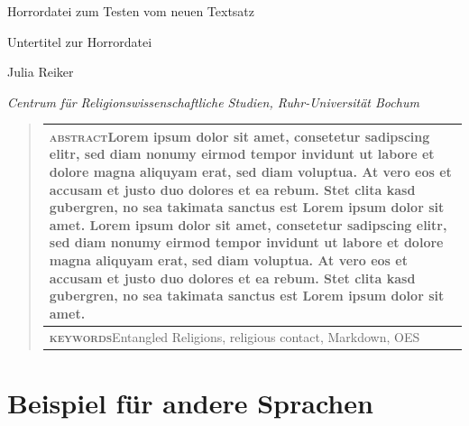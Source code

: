 \documentclass[
  english,
  a4paper,
  DIV=12,
  footlines=2.1,
  usegeometry=true]{scrartcl}
\begin{document}
\begin{singlespace}
\vspace*{2\baselineskip}
{\LARGE\noindent\raggedright Horrordatei zum Testen
vom neuen Textsatz\par}
\vspace*{.5\baselineskip}
{\Large\noindent\raggedright Untertitel zur
Horrordatei\par}
\vspace{2\baselineskip}
{\noindent Julia Reiker\par}
{\normalfont\itshape\normalsize\noindent Centrum für
Religionswissenschaftliche Studien, Ruhr-Universität Bochum\par}
\vspace{\baselineskip}
\vspace{2\baselineskip}
\end{singlespace}
\begin{quote}
\small
\begin{tabular}{@{}p{\linewidth}@{}}
\toprule
{\bfseries\scshape abstract}\hspace{1em}Lorem ipsum dolor sit amet,
consetetur sadipscing elitr, sed diam nonumy eirmod tempor invidunt ut
labore et dolore magna aliquyam erat, sed diam voluptua. At vero eos et
accusam et justo duo dolores et ea rebum. Stet clita kasd gubergren, no
sea takimata sanctus est Lorem ipsum dolor sit amet. Lorem ipsum dolor
sit amet, consetetur sadipscing elitr, sed diam nonumy eirmod tempor
invidunt ut labore et dolore magna aliquyam erat, sed diam voluptua. At
vero eos et accusam et justo duo dolores et ea rebum. Stet clita kasd
gubergren, no sea takimata sanctus est Lorem ipsum dolor sit amet.\\
\midrule[\heavyrulewidth]
{\bfseries\scshape keywords}\hspace{1em}Entangled Religions, religious
contact, Markdown, OES\\
\bottomrule
\end{tabular}
\end{quote}
\vspace{1.8181\baselineskip} %

\hypertarget{beispiel-fuxfcr-andere-sprachen}{%
\section{Beispiel für andere
Sprachen}\label{beispiel-fuxfcr-andere-sprachen}}
\end{document}
